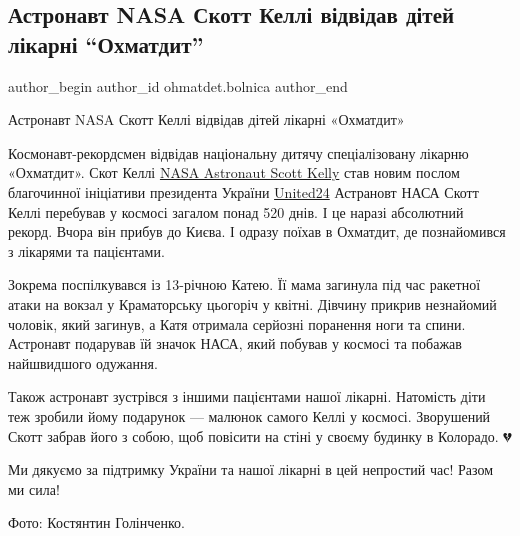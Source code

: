  
 
 
 
 
 
\subsection{Астронавт NASA Скотт Келлі відвідав дітей лікарні \enquote{Охматдит}}
\label{sec:28_11_2022.fb.ohmatdet.bolnica.1.astronavt}
 
\ifcmt
 author_begin
   author_id ohmatdet.bolnica
 author_end
\fi

Астронавт NASA Скотт Келлі відвідав дітей лікарні «Охматдит»💫

Космонавт-рекордсмен відвідав національну дитячу спеціалізовану лікарню
«Охматдит». Скот Келлі \href{https://www.facebook.com/StationCDRKelly}{NASA
Astronaut Scott Kelly} став новим послом благочинної ініціативи президента
України \href{https://www.facebook.com/u24.gov.ua}{United24} Астрановт НАСА
Скотт Келлі перебував у космосі загалом понад 520 днів. І це наразі абсолютний
рекорд. Вчора він прибув до Києва. І одразу поїхав в Охматдит, де познайомився
з лікарями та пацієнтами.


Зокрема поспілкувався із 13-річною Катею. Її мама загинула під час ракетної
атаки на вокзал у Краматорську цьогоріч у квітні. Дівчину прикрив незнайомий
чоловік, який загинув, а Катя отримала серйозні поранення ноги та спини.
Астронавт подарував їй значок НАСА, який побував у космосі та побажав
найшвидшого одужання. 


Також астронавт зустрівся з іншими пацієнтами нашої лікарні. Натомість діти теж
зробили йому подарунок — малюнок самого Келлі у космосі. Зворушений Скотт
забрав його з собою, щоб повісити на стіні у своєму будинку в Колорадо. 💔

Ми дякуємо за підтримку України та нашої лікарні в цей непростий час! Разом ми
сила!🚀

Фото: Костянтин Голінченко.

